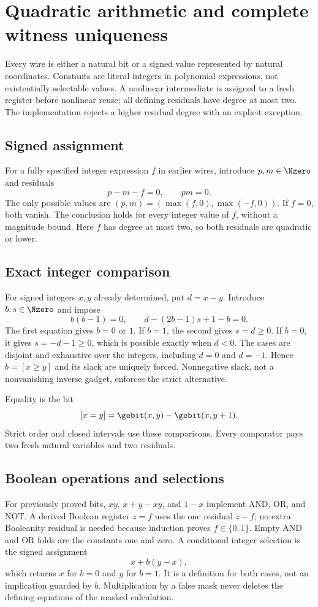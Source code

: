 \documentclass[11pt,a4paper]{article}
\numberwithin{equation}{section}
\begin{document}
\section{Quadratic arithmetic and complete witness uniqueness}\label{fpa:pq:sec:gates}
Every wire is either a natural bit or a signed value represented by natural coordinates. Constants are literal integers in polynomial expressions, not existentially selectable values. A nonlinear intermediate is assigned to a fresh register before nonlinear reuse; all defining residuals have degree at most two. The implementation rejects a higher residual degree with an explicit exception.

\subsection{Signed assignment}
For a fully specified integer expression $f$ in earlier wires, introduce $p,m\in\Nzero$ and residuals
\[
p-m-f=0,\qquad pm=0.
\]
The only possible values are $(p,m)=(\max(f,0),\max(-f,0))$. If $f=0$, both vanish. The conclusion holds for every integer value of $f$, without a magnitude bound. Here $f$ has degree at most two, so both residuals are quadratic or lower.

\subsection{Exact integer comparison}
For signed integers $x,y$ already determined, put $d=x-y$. Introduce $b,s\in\Nzero$ and impose
\begin{equation}\label{fpa:pq:eq:compare}
b(b-1)=0,\qquad d-(2b-1)s+1-b=0.
\end{equation}
The first equation gives $b=0$ or $1$. If $b=1$, the second gives $s=d\ge0$. If $b=0$, it gives $s=-d-1\ge0$, which is possible exactly when $d<0$. The cases are disjoint and exhaustive over the integers, including $d=0$ and $d=-1$. Hence $b=[x\ge y]$ and its slack are uniquely forced. Nonnegative slack, not a nonvanishing inverse gadget, enforces the strict alternative.

Equality is the bit
\[
[x=y]=\gebit(x,y)-\gebit(x,y+1).
\]
Strict order and closed intervals use these comparisons. Every comparator pays two fresh natural variables and two residuals.

\subsection{Boolean operations and selections}
For previously proved bits, $xy$, $x+y-xy$, and $1-x$ implement AND, OR, and NOT. A derived Boolean register $z=f$ uses the one residual $z-f$; no extra Booleanity residual is needed because induction proves $f\in\{0,1\}$. Empty AND and OR folds are the constants one and zero. A conditional integer selection is the signed assignment
\[
x+b(y-x),
\]
which returns $x$ for $b=0$ and $y$ for $b=1$. It is a definition for both cases, not an implication guarded by $b$. Multiplication by a false mask never deletes the defining equations of the masked calculation.
\end{document}
